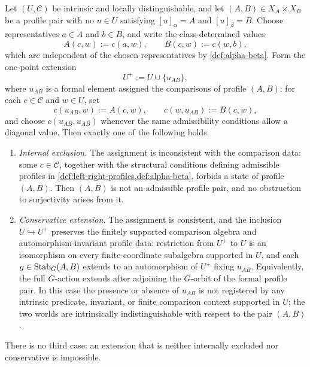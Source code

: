 \begin{lemma}
	\label{lem:conservative-completion-dichotomy}
	Let \((U,\mathcal C)\) be intrinsic and locally distinguishable, and let
	\((A,B)\in X_A\times X_B\) be a profile pair with no \(u\in U\)
	satisfying \([u]_\alpha=A\) and \([u]_\beta=B\). Choose representatives
	\(a\in A\) and \(b\in B\), and write the class-determined values
	\[
		A(c,w):=c(a,w),
		\qquad
		B(c,w):=c(w,b),
	\]
	which are independent of the chosen representatives by
	\cref{def:alpha-beta}. Form the one-point extension
	\[
		U^+:=U\cup\{u_{AB}\},
	\]
	where \(u_{AB}\) is a formal element assigned the comparisons of profile
	\((A,B)\): for each \(c\in\mathcal C\) and \(w\in U\), set
	\[
		c(u_{AB},w):=A(c,w),
		\qquad
		c(w,u_{AB}):=B(c,w),
	\]
	and choose \(c(u_{AB},u_{AB})\) whenever the same admissibility conditions
	allow a diagonal value. Then exactly one of the following holds.
	\begin{enumerate}[label=\textup{(\alph*)}]
		\item\label{case:internal-exclusion}
		      \emph{Internal exclusion.} The assignment is inconsistent with the
		      comparison data: some \(c\in\mathcal C\), together with the
		      structural conditions defining admissible profiles in
		      \cref{def:left-right-profiles,def:alpha-beta}, forbids a state of
		      profile \((A,B)\). Then \((A,B)\) is not an admissible profile pair,
		      and no obstruction to surjectivity arises from it.
		\item\label{case:conservative-extension}
		      \emph{Conservative extension.} The assignment is consistent, and
		      the inclusion \(U\hookrightarrow U^+\) preserves the finitely
		      supported comparison algebra and automorphism-invariant profile data:
		      restriction from \(U^+\) to \(U\) is an isomorphism on every
		      finite-coordinate subalgebra supported in \(U\), and each
		      \(g\in\operatorname{Stab}_G(A,B)\) extends to an automorphism of \(U^+\) fixing
		      \(u_{AB}\). Equivalently, the full \(G\)-action extends after
		      adjoining the \(G\)-orbit of the formal profile pair. In this case
		      the presence or absence of \(u_{AB}\) is not registered by any
		      intrinsic predicate, invariant, or finite comparison context
		      supported in \(U\); the two worlds are intrinsically
		      indistinguishable with respect to the pair \((A,B)\).
	\end{enumerate}
	There is no third case: an extension that is neither internally excluded
	nor conservative is impossible.
\end{lemma}
